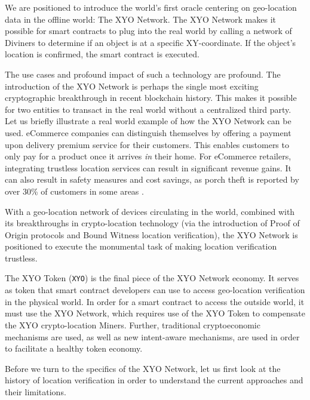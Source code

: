 \documentclass{article}
\begin{document}
We are positioned to introduce the world's first oracle centering on geo-location data in the offline world: The XYO Network. The XYO Network makes it possible for smart contracts to plug into the real world by calling a network of Diviners to determine if an object is at a specific XY-coordinate. If the object’s location is confirmed, the smart contract is executed. 

The use cases and profound impact of such a technology are profound. The introduction of the XYO Network is perhaps the single most exciting cryptographic breakthrough in recent blockchain history. This makes it possible for two entities to transact in the real world without a centralized third party. Let us briefly illustrate a real world example of how the XYO Network can be used. eCommerce companies can distinguish themselves by offering a payment upon delivery premium service for their customers. This enables customers to only pay for a product once it arrives \textit{in} their home. For eCommerce retailers, integrating trustless location services can result in significant revenue gains. It can also result in safety measures and cost savings, as porch theft is reported by over 30\% of customers in some areas \cite{comcast-packagesurvey}.


With a geo-location network of devices circulating in the world, combined with its breakthroughs in crypto-location technology (via the introduction of Proof of Origin protocols and Bound Witness location verification), the XYO Network is positioned to execute the monumental task of making location verification trustless. 

The XYO Token (\texttt{XYO}) is the final piece of the XYO Network economy. It serves as token that smart contract developers can use to access geo-location verification in the physical world. In order for a smart contract to access the outside world, it must use the XYO Network, which requires use of the XYO Token to compensate the XYO crypto-location Miners. Further, traditional cryptoeconomic mechanisms are used, as well as new intent-aware mechanisms, are used in order to facilitate a healthy token economy.

Before we turn to the specifics of the XYO Network, let us first look at the history of location verification in order to understand the current approaches and their limitations. 
\end{document}
